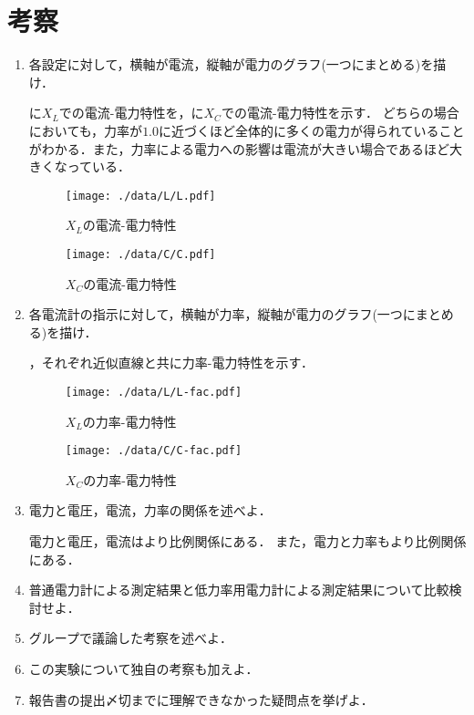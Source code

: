 \clearpage
\section{考察}
\begin{enumerate}[1.)]
	\item 各設定に対して，横軸が電流，縦軸が電力のグラフ(一つにまとめる)を描け．
	
	に$X_{L}$での電流-電力特性を，に$X_{C}$での電流-電力特性を示す．
	どちらの場合においても，力率が$1.0$に近づくほど全体的に多くの電力が得られていることがわかる．また，力率による電力への影響は電流が大きい場合であるほど大きくなっている．
	\begin{figure}[h]
	\centering
	\texttt{[image: ./data/L/L.pdf]}
	\caption{$X_L$の電流-電力特性}
	\label{fig:L}
	\end{figure}
	\begin{figure}[h]
	\centering
	\texttt{[image: ./data/C/C.pdf]}
	\caption{$X_C$の電流-電力特性}
	\label{fig:C}
	\end{figure}
	\item 各電流計の指示に対して，横軸が力率，縦軸が電力のグラフ(一つにまとめる)を描け．
	
	，それぞれ近似直線と共に力率-電力特性を示す．
	\begin{figure}[h]
	\centering
	\texttt{[image: ./data/L/L-fac.pdf]}
	\caption{$X_L$の力率-電力特性}
	\label{fig:L-fac}
	\end{figure}
	\begin{figure}[h]
	\centering
	\texttt{[image: ./data/C/C-fac.pdf]}
	\caption{$X_C$の力率-電力特性}
	\label{fig:C-fac}
	\end{figure}
	\item 電力と電圧，電流，力率の関係を述べよ．
	
	電力と電圧，電流はより比例関係にある．
	また，電力と力率もより比例関係にある．
	\item 普通電力計による測定結果と低力率用電力計による測定結果について比較検討せよ．
	\item グループで議論した考察を述べよ．
	\item この実験について独自の考察も加えよ．
	\item 報告書の提出〆切までに理解できなかった疑問点を挙げよ．
\end{enumerate}